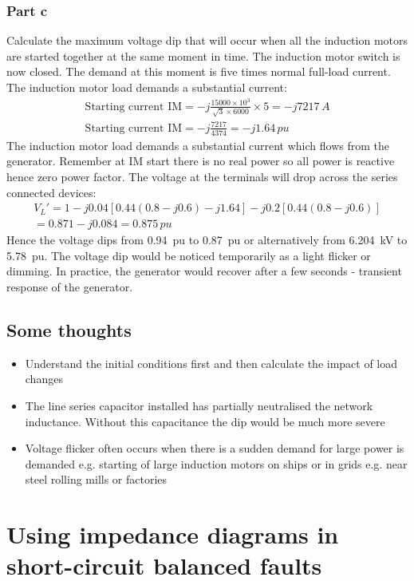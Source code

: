 \documentclass[class=report, crop=false, 12pt,a4paper]{standalone}
\begin{document}
\subsubsection{Part c}
Calculate the maximum voltage dip that will occur when all the induction motors are started together at the same moment in time. The induction motor switch is now closed. The demand at this moment is five times normal full-load current. The induction motor load demands a substantial current:
\begin{gather}
	\textrm{Starting current IM} = -j\frac{15000 \times 10^3}{\sqrt{3}\times 6000}\times 5 = -j7217\,\si{A}\\
	\textrm{Starting current IM} = -j\frac{7217}{4374} = -j1.64\,\si{pu}
\end{gather}
The induction motor load demands a substantial current which flows from the generator. Remember at IM start there is no real power so all power is reactive hence zero power factor. The voltage at the terminals will drop across the series connected devices:
\begin{gather}
	V_L' = 1-j0.04\left[0.44\left(0.8-j0.6\right)-j1.64\right]-j0.2\left[0.44\left(0.8-j0.6\right)\right]\\
	= 0.871 -j0.084 = 0.875\,\si{pu}
\end{gather}
Hence the voltage dips from \SI{0.94}{pu} to \SI{0.87}{pu} or alternatively from \SI{6.204}{kV} to \SI{5.78}{pu}. The voltage dip would be noticed temporarily as a light flicker or dimming. In practice, the generator would recover after a few seconds - transient response of the generator.
\subsection{Some thoughts}
\begin{itemize}
	\item Understand the initial conditions first and then calculate the impact of load changes
	\item The line series capacitor installed has partially neutralised the network inductance. Without this capacitance the dip would be much more severe
	\item Voltage flicker often occurs when there is a sudden demand for large power is demanded e.g. starting of large induction motors on ships or in grids e.g. near steel rolling mills or factories
\end{itemize}
\section{Using impedance diagrams in short-circuit balanced faults}
\end{document}
